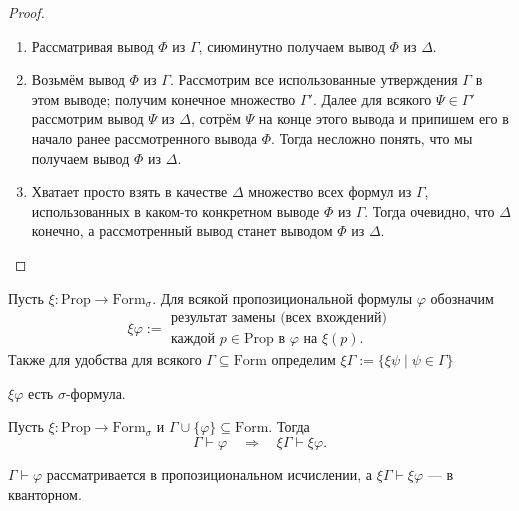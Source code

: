 \documentclass[12pt,a4paper]{article}
\newcommand{\Prop}{\ensuremath{\mathrm{Prop}}\xspace}
\newcommand{\Formul}{\ensuremath{\mathrm{Form}}\xspace}
\begin{document}
    \begin{proof}\ 
        \begin{enumerate}
            \item Рассматривая вывод $\Phi$ из $\Gamma$, сиюминутно получаем вывод $\Phi$ из $\Delta$.
            \item Возьмём вывод $\Phi$ из $\Gamma$. Рассмотрим все использованные утверждения $\Gamma$ в этом выводе; получим конечное множество $\Gamma'$. Далее для всякого $\Psi \in \Gamma'$ рассмотрим вывод $\Psi$ из $\Delta$, сотрём $\Psi$ на конце этого вывода и припишем его в начало ранее рассмотренного вывода $\Phi$. Тогда несложно понять, что мы получаем вывод $\Phi$ из $\Delta$.
            \item Хватает просто взять в качестве $\Delta$ множество всех формул из $\Gamma$, использованных в каком-то конкретном выводе $\Phi$ из $\Gamma$. Тогда очевидно, что $\Delta$ конечно, а рассмотренный вывод станет выводом $\Phi$ из $\Delta$.
        \end{enumerate}
    \end{proof}

    \begin{definition}
        Пусть $\xi: \Prop \to \Formul_\sigma$. Для всякой пропозициональной формулы $\varphi$ обозначим
        \[
            \xi \varphi :=
            \begin{gathered}
                \text{результат замены (всех вхождений)}\\
                \text{каждой $p \in \Prop$ в $\varphi$ на $\xi(p)$.}
            \end{gathered}
        \]
        Также для удобства для всякого $\Gamma \subseteq \Formul$ определим $\xi \Gamma := \{\xi \psi \mid \psi \in \Gamma\}$
    \end{definition}

    \begin{remark*}
        $\xi \varphi$ есть $\sigma$-формула.
    \end{remark*}

    \begin{lemma}
        Пусть $\xi: \Prop \rightarrow \Formul_\sigma$ и $\Gamma \cup \{\varphi\} \subseteq \Formul$. Тогда
        \[
            \Gamma \vdash \varphi
            \quad \Longrightarrow \quad
            \xi \Gamma \vdash \xi \varphi.
        \]
    \end{lemma}
    
    \begin{remark*}
        $\Gamma \vdash \varphi$ рассматривается в пропозициональном исчислении, а $\xi \Gamma \vdash \xi \varphi$ --- в кванторном.
    \end{remark*}
\end{document}
